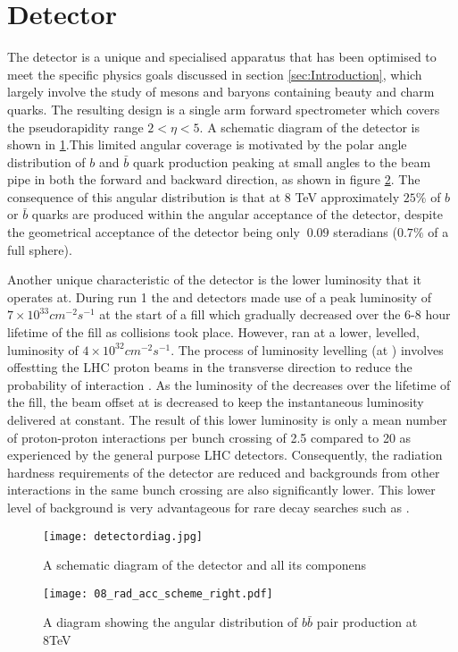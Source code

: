 
\section{Detector}
\label{sec:Detector}

The \lhcb detector is a unique and specialised apparatus that has been optimised to meet the specific physics goals discussed in section \ref{sec:Introduction}, which largely involve the study of mesons and baryons containing beauty and charm quarks.  The resulting design is a single arm forward spectrometer which covers the pseudorapidity range $2 < \eta < 5$.  A schematic diagram of the detector is shown in \ref{fig:detectdiag}.This limited angular coverage is motivated by the polar angle distribution of  $b$ and $\bar{b}$ quark production peaking at small angles to the beam pipe in both the forward and backward direction, as shown in figure \ref{fig:bbarprod}.  The consequence of this angular distribution is that at 8 TeV approximately $25\%$ of $b$ or $\bar{b}$ quarks are produced within the angular acceptance of the \lhcb detector, despite the geometrical acceptance of the detector being only $~0.09$ steradians ($0.7\%$ of a full sphere).

Another unique characteristic of the \lhcb detector is the lower luminosity that it operates at.  During run 1 the \atlas and \cms detectors made use of a peak luminosity of $7\times 10^{33}cm^{-2}s^{-1}$ at the start of a fill which gradually decreased over the 6-8 hour lifetime of the fill as collisions took place.  However, \lhcb ran at a lower, levelled, luminosity of $4\times 10^{32}cm^{-2}s^{-1}$.  The process of luminosity levelling (at \lhcb) involves offestting the LHC proton beams in the transverse direction to reduce the probability of interaction \cite{Follin:2014nva}. As the luminosity of the \lhc decreases over the lifetime of the fill, the beam offset at \lhcb is decreased to keep the instantaneous luminosity delivered at \lhcb constant.  The result of this lower luminosity is only a mean number of proton-proton interactions per bunch crossing of 2.5 compared to 20 as experienced by the general purpose LHC detectors.  Consequently, the radiation hardness requirements of the \lhcb detector are reduced and backgrounds from other interactions in the same bunch crossing are also significantly lower.  This lower level of background is very advantageous for rare decay searches such as \Bz \to \muon \muon.
\begin{figure}[h]
  \centering
  \texttt{[image: detectordiag.jpg]}
  \caption{ A schematic diagram of the \lhcb detector and all its componens}
  \label{fig:detectdiag}
\end{figure}
\begin{figure}[h]
  \centering
  \texttt{[image: 08\_rad\_acc\_scheme\_right.pdf]}
  \caption{A diagram showing the angular distribution of $b \bar{b}$ pair production at 8TeV}
  \label{fig:bbarprod}
\end{figure}
